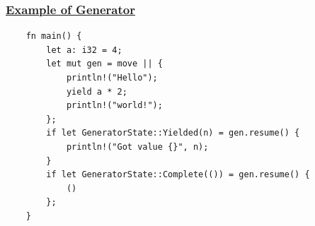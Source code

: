 \begin{frame}[fragile]
    \frametitle{\href{https://cfsamson.github.io/books-futures-explained/4_generators_async_await.html\#how-generators-work}{Example of Generator}}
% 
% 
\begin{block}{}
    \begin{verbatim}
    fn main() {
        let a: i32 = 4;
        let mut gen = move || {
            println!("Hello");
            yield a * 2;
            println!("world!");
        };
        if let GeneratorState::Yielded(n) = gen.resume() {
            println!("Got value {}", n);
        }
        if let GeneratorState::Complete(()) = gen.resume() {
            ()
        };
    } \end{verbatim}
\end{block}
% 
\end{frame}
